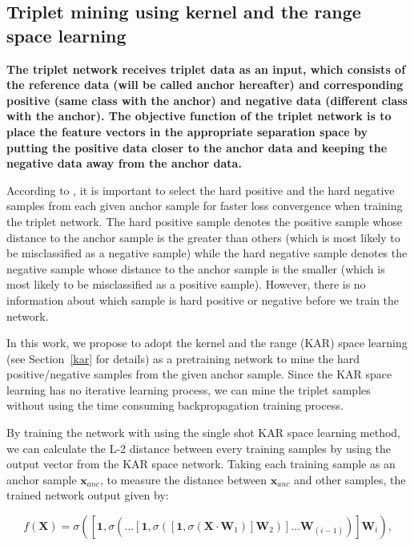 \documentclass[runningheads]{llncs}
\begin{document}
\subsection{Triplet mining using kernel and the range space learning}

\textbf{The triplet network receives triplet data as an input, which consists of the reference data (will be called anchor hereafter) and corresponding positive (same class with the anchor) and negative data (different class with the anchor). The objective function of the triplet network is to place the feature vectors in the appropriate separation space by putting the positive data closer to the anchor data and keeping the negative data away from the anchor data.}

According to \cite{schroff2015facenet}, it is important to select the hard positive and the hard negative samples from each given anchor sample for faster loss convergence when training the triplet network.
The hard positive sample denotes the positive sample whose distance to the anchor sample is the greater than others (which is most likely to be misclassified as a negative sample) while the hard negative sample denotes the negative sample whose distance to the anchor sample is the smaller (which is most likely to be misclassified as a positive sample). However, there is no information about which sample is hard positive or negative before we train the network.

In this work, we propose to adopt the kernel and the range (KAR) space learning (see Section~\ref{kar} for details) as a pretraining network to mine the hard positive/negative samples from the given anchor sample. Since the KAR space learning has no iterative learning process, we can mine the triplet samples without using the time consuming backpropagation training process.
 
By training the network with using the single shot KAR space learning method, we can calculate the L-2 distance between every training samples by using the output vector from the KAR space network. Taking each training sample as an anchor sample $\mathbf{x}_{anc}$, to measure the distance between $\mathbf{x}_{anc}$ and other samples, the trained network output given by:

\begin{equation}
    f\left(\mathbf{X}\right) = \sigma\left(\left[\mathbf{1},\sigma\left(\dots\left[\mathbf{1},\sigma\left(\left[\mathbf{1},\sigma\left(\mathbf{X}\cdot\mathbf{W}_{1}\right)\right]\mathbf{W}_{2}\right)\right]\dots\mathbf{W}_{(i-1)}\right)\right]\mathbf{W}_{i}\right),
\end{equation}
\end{document}
